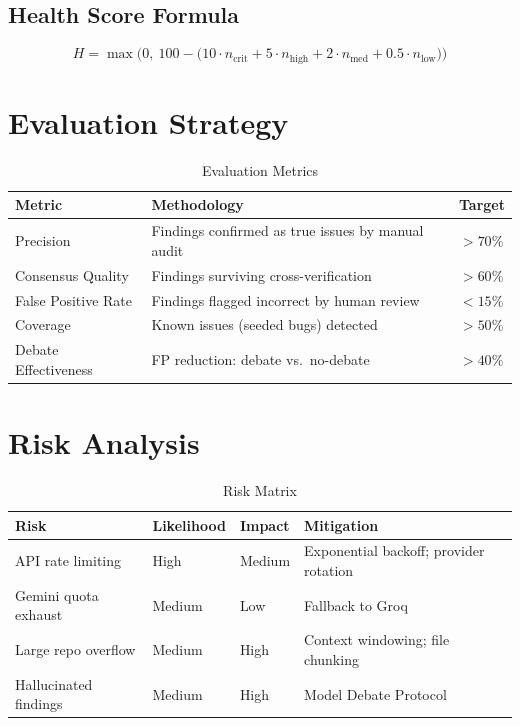 \documentclass[12pt,a4paper]{article}
\begin{document}
\subsection{Health Score Formula}

$$H = \max\!\Big(0,\ 100 - \big(10 \cdot n_{\text{crit}} + 5 \cdot n_{\text{high}} + 2 \cdot n_{\text{med}} + 0.5 \cdot n_{\text{low}}\big)\Big)$$

\section{Evaluation Strategy}

\begin{table}[H]
\centering
\caption{Evaluation Metrics}
\begin{tabularx}{\textwidth}{lXl}
\toprule
\textbf{Metric} & \textbf{Methodology} & \textbf{Target} \\
\midrule
Precision & Findings confirmed as true issues by manual audit & $> 70\%$ \\
Consensus Quality & Findings surviving cross-verification & $> 60\%$ \\
False Positive Rate & Findings flagged incorrect by human review & $< 15\%$ \\
Coverage & Known issues (seeded bugs) detected & $> 50\%$ \\
Debate Effectiveness & FP reduction: debate vs.\ no-debate & $> 40\%$ \\
\bottomrule
\end{tabularx}
\end{table}

\section{Risk Analysis}

\begin{table}[H]
\centering
\caption{Risk Matrix}
\begin{tabularx}{\textwidth}{lllX}
\toprule
\textbf{Risk} & \textbf{Likelihood} & \textbf{Impact} & \textbf{Mitigation} \\
\midrule
API rate limiting & High & Medium & Exponential backoff; provider rotation \\
Gemini quota exhaust & Medium & Low & Fallback to Groq \\
Large repo overflow & Medium & High & Context windowing; file chunking \\
Hallucinated findings & Medium & High & Model Debate Protocol \\
\bottomrule
\end{tabularx}
\end{table}
\end{document}
